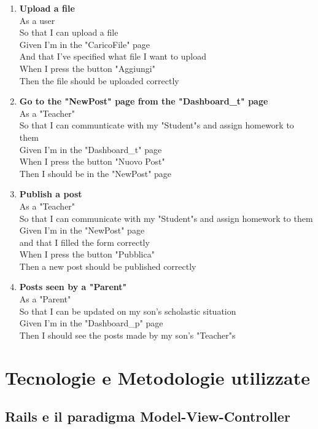 \documentclass[Lau, binding=0.6cm, oneside]{sapthesis}
\begin{document}
\begin{enumerate}
	\item \textbf{Upload a file}\\
			As a user\\
			So that I can upload a file\\
			Given I’m in the "CaricoFile" page\\
			And that I’ve specified what file I want to upload\\
			When I press the button "Aggiungi"\\
			Then the file should be uploaded correctly\\
	\item \textbf{Go to the "NewPost" page from the "Dashboard\_t" page}\\
			As a "Teacher"\\
			So that I can communticate with my "Student"s and assign homework to them\\
			Given I’m in the "Dashboard\_t" page\\
			When I press the button "Nuovo Post"\\
			Then I should be in the "NewPost" page\\
	\item \textbf{Publish a post}\\
			As a "Teacher"\\
			So that I can communicate with my "Student"s and assign homework to them\\
			Given I’m in the "NewPost" page\\
			and that I filled the form correctly\\
			When I press the button "Pubblica"\\
			Then a new post should be published correctly\\
	\item \textbf{Posts seen by a "Parent"}\\
			As a "Parent"\\
			So that I can be updated on my son’s scholastic situation\\
			Given I’m in the "Dashboard\_p" page\\
			Then I should see the posts made by my son’s "Teacher"s\\
\end{enumerate}

\chapter{Tecnologie e Metodologie utilizzate}

\section{Rails e il paradigma Model-View-Controller} \label{mvc}
\end{document}
